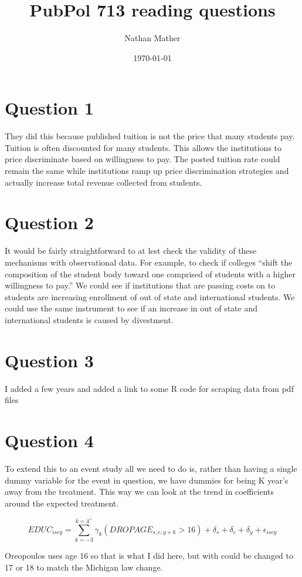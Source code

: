 \documentclass[11pt]{article}
\title{PubPol 713 reading questions} %
\author{Nathan Mather} %
\date{\today} %
\begin{document}
	
	\maketitle %
	
	\setcounter{tocdepth}{2} %
	
	
	
\section{Question 1}	
They did this because published tuition is not the price that many students pay. Tuition is often discounted for many students. This allows the institutions to price discriminate based on willingness to pay. The posted tuition rate could remain the same while institutions ramp up price discrimination strategies and actually increase total revenue collected from students.

\section{Question 2}
It would be fairly straightforward to at lest check the validity of these mechanisms with observational data. For example, to check if colleges “shift the composition of the student body toward one comprised of students with a higher willingness to pay.” We could see if institutions that are passing costs on to students are increasing enrollment of out of state and international students. We could use the same instrument to see if an increase in out of state and international students is caused by divestment.  

\section{Question 3}
I added a few years and added a link to some R code for scraping data from pdf files 

\section{Question 4}
To extend this to an event study all we need to do is, rather than having a single dummy variable for the event in question, we have dummies for being K year’s away from the treatment. This way we can look at the trend in coefficients around the expected treatment. 



$$
EDUC_{iscy} = \sum_{k=-3}^{k=4^+} \gamma_k (DROPAGE_{s,c,y+k} > 16) +  \delta_s +  \delta_c  +  \delta_y +  \epsilon_{iscy}    $$	
	
Oreopoulos uses age 16 so that is what I did here, but with could be changed to 17 or 18 to match the Michigan law change. 
	
	
\end{document}
